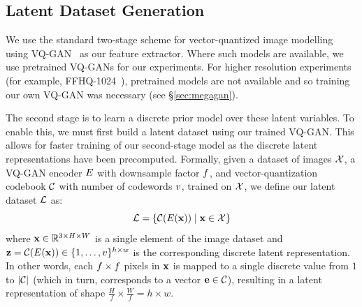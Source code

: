 

\subsection{Latent Dataset Generation}
We use the standard two-stage scheme for vector-quantized image
modelling~\cite{oord2018neural,razavi2019generating,esser2021taming,bondtaylor2021unleashing}
using VQ-GAN~\cite{esser2021taming} as our feature extractor. Where such models
are available, we use pretrained VQ-GANs for our experiments. For higher
resolution experiments (for example, FFHQ-1024~\cite{karras2019stylebased}),
pretrained models are not available and so training our own VQ-GAN was necessary
(see \S\ref{sec:megagan}).

The second stage is to learn a discrete prior model over these latent variables.
To enable this, we must first build a latent dataset using our trained VQ-GAN.
This allows for faster training of our second-stage model as the discrete latent
representations have been precomputed. Formally, given a dataset of images
$\mathcal{X}$, a VQ-GAN encoder $E$ with downsample factor
$f$, and vector-quantization codebook $\mathcal{C}$ with
number of codewords $v$, trained on $\mathcal{X}$, we define our
latent dataset $\mathcal{L}$ as:
\begin{equation}
    \mathcal{L} = \{\mathcal{C}(E(\mathbf{x})) \mid \mathbf{x} \in \mathcal{X} \}
\end{equation}
where $\mathbf{x} \in \mathbb{R}^{3 \times H \times W}$ is a single element of the image
dataset and $\mathbf{z} = \mathcal{C}(E(\mathbf{x})) \in \{1, \dots,
v\}^{h \times w}$ is the corresponding discrete latent
representation. In other words, each $f \times f$
pixels in $\mathbf{x}$ is mapped to a single discrete value from $1$ to
$|\mathcal{C}|$ (which in turn, corresponds to a vector $\mathbf{e} \in
\mathcal{C}$),
resulting in a latent representation of shape $\frac{H}{f} \times \frac{W}{f} =
h \times w$.

